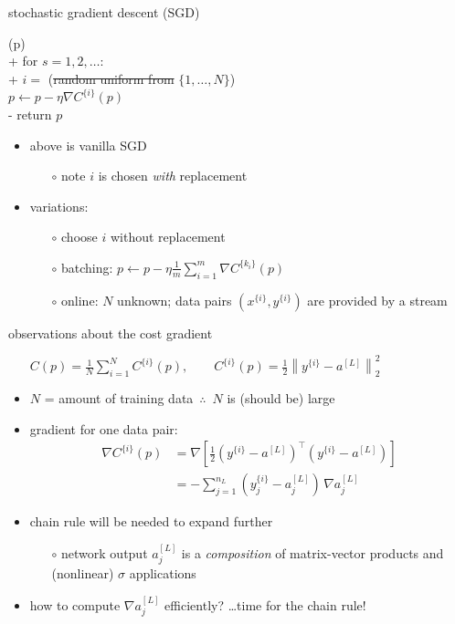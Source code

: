 \documentclass[xcolor={svgnames},
               hyperref={colorlinks,citecolor=DeepPink4,linkcolor=FireBrick,urlcolor=Maroon}]
               {beamer}
\newcommand{\grad}{\nabla}
\begin{document}
\begin{frame}{stochastic gradient descent (SGD)}

\begin{pseudo*}
(p)\text{:} \\+
    for $s = 1,2,\dots$: \\+
        $i=$ (\st{random uniform from} $\{1,\dots,N\}$) \\
        $p \gets p - \eta \grad C^{\{i\}}(p)$ \\-
    return $p$
\end{pseudo*}

\begin{itemize}
\item above is \alert{vanilla} SGD
    \begin{itemize}
    \item[$\circ$] note $i$ is chosen \emph{with} replacement
    \end{itemize}
\item variations:
    \begin{itemize}
    \item[$\circ$] choose $i$ without replacement
    \item[$\circ$] batching: $p \gets p - \eta \frac{1}{m} \sum_{i=1}^m \grad C^{\{k_i\}}(p)$
    \item[$\circ$] \alert{online}: $N$ unknown; data pairs $(x^{\{i\}},y^{\{i\}})$ are provided by a stream
    \end{itemize}
\end{itemize}
\end{frame}


\begin{frame}{observations about the cost gradient}

\begin{itemize}
\item[] \qquad \small $\displaystyle C(p) = \frac{1}{N} \sum_{i=1}^N C^{\{i\}}(p), \qquad C^{\{i\}}(p) = \frac{1}{2} \left\|y^{\{i\}} - a^{[L]}\right\|_2^2$ \normalsize

\medskip
\item $N$ = amount of training data\, $\therefore$\, $N$ is (should be) large
\item gradient for one data pair:
\begin{align*}
\grad C^{\{i\}}(p) &= \grad\left[\frac{1}{2} (y^{\{i\}} - a^{[L]})^\top (y^{\{i\}} - a^{[L]})\right] \\
    &= - \sum_{j=1}^{n_L} (y_j^{\{i\}} - a^{[L]}_j)\, \grad a^{[L]}_j
\end{align*}
\item chain rule will be needed to expand further
    \begin{itemize}
    \item[$\circ$] network output $a_j^{[L]}$ is a \emph{composition} of matrix-vector products and (nonlinear) $\sigma$ applications
    \end{itemize}
\item how to compute $\grad a^{[L]}_j$ efficiently? \dots time for the chain rule!
\end{itemize}
\end{frame}
\end{document}
